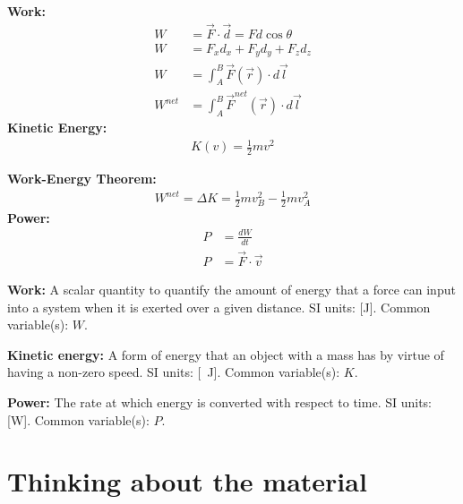 \begin{importantEquations}
\begin{multicols}{2}
\textbf{Work:}
\begin{align*}
W &= \vec F \cdot \vec d = Fd\cos\theta\\
W &= F_xd_x+F_yd_y+F_zd_z\\
W &=\int_A^B \vec F(\vec r) \cdot  d\vec l\\
W^{net} &= \int_A^B \vec F^{net}(\vec r) \cdot d\vec l
\end{align*}
\textbf{Kinetic Energy:}
\begin{align*}
K(v) = \frac{1}{2} mv^2
\end{align*}
\columnbreak

\textbf{Work-Energy Theorem:}
\begin{align*}
W^{net} = \Delta K = \frac{1}{2} mv_B^2 - \frac{1}{2} mv_A^2
\end{align*}
\textbf{Power:}
\begin{align*}
P &= \frac{dW}{dt}\\
P &= \vec F \cdot \vec v
\end{align*}
\end{multicols}
\end{importantEquations}

\begin{definitions}
	\textbf{Work:} A scalar quantity to quantify the amount of energy that a force can input into a system when it is exerted over a given distance. SI units: [\si{J}]. Common variable(s): $W$.
	\item \textbf{Kinetic energy:} A form of energy that an object with a mass has by virtue of having a non-zero speed. SI units: [\SI{}{J}]. Common variable(s): $K$.
	\item \textbf{Power:} The rate at which energy is converted with respect to time. SI units: [\si{W}]. Common variable(s): $P$.
\end{definitions}

\newpage
\section{Thinking about the material}


